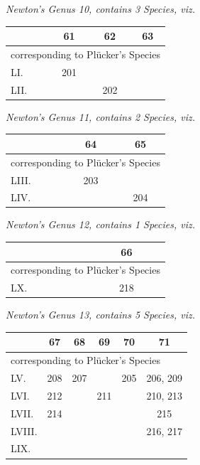 \documentclass[11pt]{article}
\begin{document}
\medskip
\noindent\emph{Newton's Genus 10, contains 3 Species, viz.}
\begin{center}\small
\begin{tabular}{|l|c|c|c|}\hline
& 61 & 62 & 63 \\\hline
\multicolumn{4}{|l|}{\quad corresponding to Pl\"ucker's Species}\\\hline
LI.   & 201 &     &     \\\hline
LII.  &     & 202 &     \\\hline
\end{tabular}
\end{center}

\medskip
\noindent\emph{Newton's Genus 11, contains 2 Species, viz.}
\begin{center}\small
\begin{tabular}{|l|c|c|}\hline
& 64 & 65 \\\hline
\multicolumn{3}{|l|}{\quad corresponding to Pl\"ucker's Species}\\\hline
LIII. & 203 &     \\\hline
LIV.  &     & 204 \\\hline
\end{tabular}
\end{center}

\medskip
\noindent\emph{Newton's Genus 12, contains 1 Species, viz.}
\begin{center}\small
\begin{tabular}{|l|c|}\hline
& 66 \\\hline
\multicolumn{2}{|l|}{\quad corresponding to Pl\"ucker's Species}\\\hline
LX. & 218 \\\hline
\end{tabular}
\end{center}

\medskip
\noindent\emph{Newton's Genus 13, contains 5 Species, viz.}
\begin{center}\small
\begin{tabular}{|l|c|c|c|c|c|}\hline
& 67 & 68 & 69 & 70 & 71 \\\hline
\multicolumn{6}{|l|}{\quad corresponding to Pl\"ucker's Species}\\\hline
LV.    & 208 & 207 &     & 205 & 206, 209 \\\hline
LVI.   & 212 &     & 211 &     & 210, 213 \\\hline
LVII.  & 214 &     &     &     & 215      \\\hline
LVIII. &     &     &     &     & 216, 217 \\\hline
LIX.   &     &     &     &     &          \\\hline
\end{tabular}
\end{center}
\end{document}

